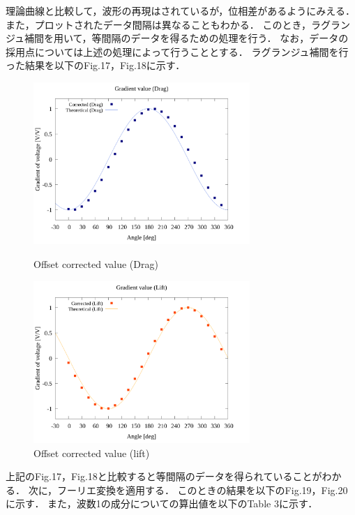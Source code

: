 \documentclass[twocolumn,a4j]{jsarticle}
\begin{document}
\newpage

理論曲線と比較して，波形の再現はされているが，位相差があるようにみえる．
また，プロットされたデータ間隔は異なることもわかる．
このとき，ラグランジュ補間を用いて，等間隔のデータを得るための処理を行う．
なお，データの採用点については上述の処理によって行うこととする．
ラグランジュ補間を行った結果を以下のFig.17，Fig.18に示す．

\begin{figure} [htbp]
    \begin{center}
        \includegraphics[width=82mm]{../../../02_workspace/result/simulation_tx=10.0_ty=-5.0_dx=5.00_dy=-2.50/plot/21/21-3_interpolated_drag.png}
        \caption{Offset corrected value (Drag)}
        \includegraphics[width=82mm]{../../../02_workspace/result/simulation_tx=10.0_ty=-5.0_dx=5.00_dy=-2.50/plot/21/21-3_interpolated_lift.png}
        \caption{Offset corrected value (lift)}
    \end{center}
\end{figure}

\newpage

上記のFig.17，Fig.18と比較すると等間隔のデータを得られていることがわかる．
次に，フーリエ変換を適用する．
このときの結果を以下のFig.19，Fig.20 に示す．
また，波数1の成分についての算出値を以下のTable 3に示す．
\end{document}
